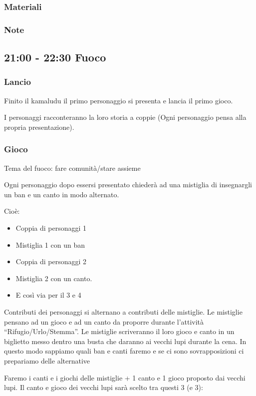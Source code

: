\documentclass[../main.tex]{subfiles}
\begin{document}
        \subsubsection{Materiali}
        \subsubsection{Note}
        
    \subsection{21:00 - 22:30 Fuoco}
        \subsubsection{Lancio}
        Finito il kamaludu il primo personaggio si presenta e lancia il primo gioco.

        I personaggi racconteranno la loro storia a coppie (Ogni personaggio pensa alla propria presentazione).
        \subsubsection{Gioco}
        Tema del fuoco: fare comunità/stare assieme
        
        Ogni personaggio dopo essersi presentato chiederà ad una mistiglia di insegnargli un ban e un canto in modo alternato.

        Cioè:
        \begin{itemize}
            \item Coppia di personaggi 1
            \item Mistiglia 1 con un ban
            \item Coppia di personaggi  2
            \item Mistiglia 2 con un canto.
            \item E così via per il 3 e 4
        \end{itemize}

        Contributi dei personaggi si alternano a contributi delle mistiglie.
        Le mistiglie pensano ad un gioco e ad un canto da proporre durante l'attività “Rifugio/Urlo/Stemma”. Le mistiglie scriveranno il loro gioco e canto in un biglietto messo dentro una busta che daranno ai vecchi lupi durante la cena. In questo modo sappiamo quali ban e canti faremo e se ci sono sovrapposizioni ci prepariamo delle alternative

        Faremo i canti e i giochi delle mistiglie + 1 canto e 1 gioco proposto dai vecchi lupi.
        Il canto e gioco dei vecchi lupi sarà scelto tra questi 3 (e 3):
        
\end{document}
